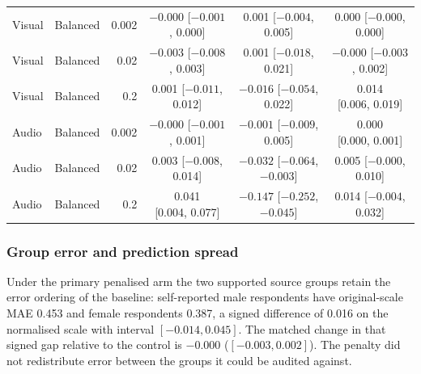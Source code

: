 \begin{table}[htbp]
\begin{adjustbox}{max width=\textwidth}
\begin{tabular}{llrccc}
\addlinespace
Visual & Balanced & 0.002 & \shortstack{$-0.000$\\{[$-0.001$, 0.000]}} & \shortstack{0.001\\{[$-0.004$, 0.005]}} & \shortstack{0.000\\{[$-0.000$, 0.000]}} \\
Visual & Balanced & 0.02 & \shortstack{$-0.003$\\{[$-0.008$, 0.003]}} & \shortstack{0.001\\{[$-0.018$, 0.021]}} & \shortstack{$-0.000$\\{[$-0.003$, 0.002]}} \\
Visual & Balanced & 0.2 & \shortstack{0.001\\{[$-0.011$, 0.012]}} & \shortstack{$-0.016$\\{[$-0.054$, 0.022]}} & \shortstack{0.014\\{[0.006, 0.019]}} \\
Audio & Balanced & 0.002 & \shortstack{$-0.000$\\{[$-0.001$, 0.001]}} & \shortstack{$-0.001$\\{[$-0.009$, 0.005]}} & \shortstack{0.000\\{[0.000, 0.001]}} \\
Audio & Balanced & 0.02 & \shortstack{0.003\\{[$-0.008$, 0.014]}} & \shortstack{$-0.032$\\{[$-0.064$, $-0.003$]}} & \shortstack{0.005\\{[$-0.000$, 0.010]}} \\
Audio & Balanced & 0.2 & \shortstack{0.041\\{[0.004, 0.077]}} & \shortstack{$-0.147$\\{[$-0.252$, $-0.045$]}} & \shortstack{0.014\\{[$-0.004$, 0.032]}} \\
\bottomrule
\end{tabular}
\end{adjustbox}
\end{table}
\FloatBarrier

\subsubsection{Group error and prediction spread}

Under the primary penalised arm the two supported source groups retain the error ordering
of the baseline: self-reported male respondents have original-scale MAE 0.453 and female
respondents 0.387, a signed difference of 0.016 on the normalised scale with interval
$[-0.014, 0.045]$. The matched change in that signed gap relative to the control is
$-0.000$ ($[-0.003, 0.002]$). The penalty did not redistribute error between the groups
it could be audited against.

